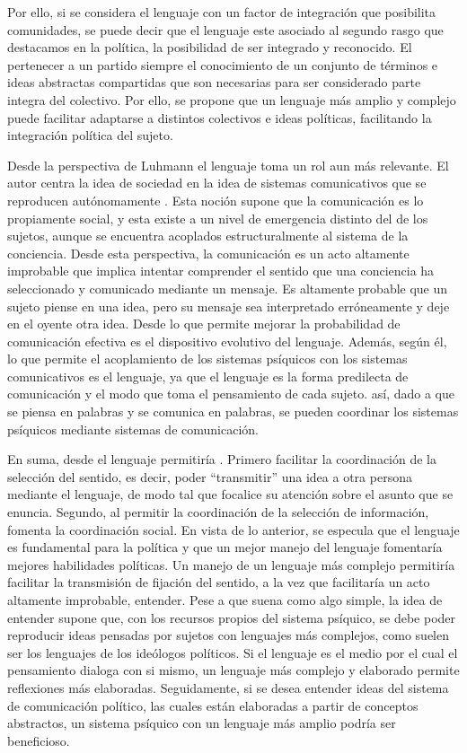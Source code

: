 \documentclass[12pt,twoside]{templates/facsothesis}
\begin{document}
Por ello, si se considera el lenguaje con un factor de integración que posibilita comunidades, se puede decir que el lenguaje este asociado al segundo rasgo que destacamos en la política, la posibilidad de ser integrado y reconocido. El pertenecer a un partido siempre el conocimiento de un conjunto de términos e ideas abstractas compartidas que son necesarias para ser considerado parte integra del colectivo. Por ello, se propone que un lenguaje más amplio y complejo puede facilitar adaptarse a distintos colectivos e ideas políticas, facilitando la integración política del sujeto.

Desde la perspectiva de Luhmann el lenguaje toma un rol aun más relevante. El autor centra la idea de sociedad en la idea de sistemas comunicativos que se reproducen autónomamente \citep{luhmann_Introduction_2013}. Esta noción supone que la comunicación es lo propiamente social, y esta existe a un nivel de emergencia distinto del de los sujetos, aunque se encuentra acoplados estructuralmente al sistema de la conciencia. Desde esta perspectiva, la comunicación es un acto altamente improbable que implica intentar comprender el sentido que una conciencia ha seleccionado y comunicado mediante un mensaje. Es altamente probable que un sujeto piense en una idea, pero su mensaje sea interpretado erróneamente y deje en el oyente otra idea. Desde \citet{luhmann_Introduction_2013} lo que permite mejorar la probabilidad de comunicación efectiva es el dispositivo evolutivo del lenguaje. Además, según él, lo que permite el acoplamiento de los sistemas psíquicos con los sistemas comunicativos es el lenguaje, ya que el lenguaje es la forma predilecta de comunicación y el modo que toma el pensamiento de cada sujeto. así, dado a que se piensa en palabras y se comunica en palabras, se pueden coordinar los sistemas psíquicos mediante sistemas de comunicación.

En suma, desde \citet{luhmann_Introduction_2013} el lenguaje permitiría . Primero facilitar la coordinación de la selección del sentido, es decir, poder ``transmitir'' una idea a otra persona mediante el lenguaje, de modo tal que focalice su atención sobre el asunto que se enuncia. Segundo, al permitir la coordinación de la selección de información, fomenta la coordinación social. En vista de lo anterior, se especula que el lenguaje es fundamental para la política y que un mejor manejo del lenguaje fomentaría mejores habilidades políticas. Un manejo de un lenguaje más complejo permitiría facilitar la transmisión de fijación del sentido, a la vez que facilitaría un acto altamente improbable, entender. Pese a que suena como algo simple, la idea de entender supone que, con los recursos propios del sistema psíquico, se debe poder reproducir ideas pensadas por sujetos con lenguajes más complejos, como suelen ser los lenguajes de los ideólogos políticos. Si el lenguaje es el medio por el cual el pensamiento dialoga con si mismo, un lenguaje más complejo y elaborado permite reflexiones más elaboradas. Seguidamente, si se desea entender ideas del sistema de comunicación político, las cuales están elaboradas a partir de conceptos abstractos, un sistema psíquico con un lenguaje más amplio podría ser beneficioso.
\end{document}
